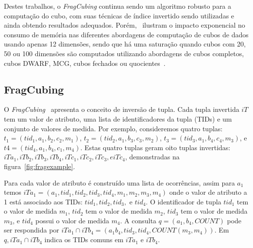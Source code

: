 {\color{cerulean}
Destes trabalhos, o \textit{FragCubing} continua sendo um algoritmo robusto para a computação do cubo, com suas técnicas de índice invertido sendo utilizadas e ainda obtendo resultados adequados.
Porém,~ ilustram o impacto exponencial no consumo de memória nas diferentes abordagens de computação de cubos de dados usando apenas 12 dimensões, sendo que há uma saturação quando cubos com 20, 50 ou 100 dimensões são computados utilizando abordagens de cubos completos, cubos DWARF, MCG, cubos fechados ou quocientes~\cite{silva:2015:abordagensParaCubo}.

\subsection{FragCubing}\label{ch:corr:cube:frag}

O \textit{FragCubing}~\cite{liHighdimensionalOLAPMinimal2004} apresenta o conceito de inversão de tupla.
Cada tupla invertida $iT$ tem um valor de atributo, uma lista de identificadores da tupla (TIDs) e um conjunto de valores de medida.
Por exemplo, consideremos quatro tuplas: $t_1 = (tid_1, a_1, b_2, c_2, m_1)$, $t_2 = (tid_2, a_1, b_3, c_3, m_2)$, $t_3 = (tid_3, a_1, b_4, c_4, m_3)$, e $t4 = (tid_4, a_1, b_4, c_1, m_4)$.
Estas quatro tuplas geram oito tuplas invertidas: $iTa_1, iTb_2, iTb_3, iTb_4, iTc_1, iTc_2, iTc_3, e iTc_4$, demonstradas na figura~\ref{fig:fragexample}.

Para cada valor de atributo é construído uma lista de ocorrências, assim para $a_1$ temos $iTa_1 = (a_1, tid_1, tid_2, tid_3, tid_4, m_1, m_2, m_3, m_4)$ onde o valor de atributo a 1 está associado aos TIDs: $tid_1, tid_2, tid_3,$ e $tid_4$.
O identificador de tupla $tid_1$ tem o valor de medida $m_1$, $tid_2$ tem o valor de medida $m_2$, $tid_3$ tem o valor de medida $m_3$, e $tid_4$ possui o valor de medida $m_4$.
A consulta $q = (a_1, b_4, COUNT)$ pode ser respondida por $iTa_1 \cap iTb_4 = (a_1b_4, tid_3, tid_4, COUNT(m_3, m_4))$.
Em $q, iTa_1 \cap iTb_4$ indica os TIDs comuns em $iTa_1$ e $iTb_4$.

}
